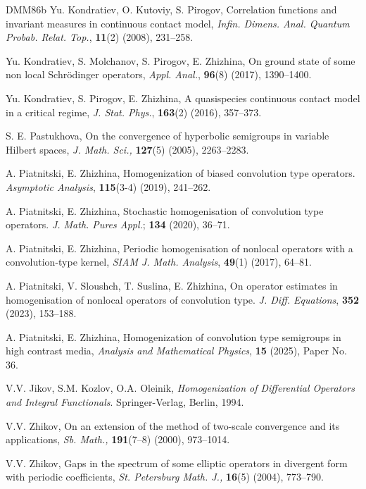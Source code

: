 \documentclass[11pt]{article}
\theoremstyle{remark}
\begin{document}
\begin{thebibliography}{DMM86b}
Yu. Kondratiev, O. Kutoviy, S. Pirogov, Correlation functions and invariant measures in continuous contact model,
{\it Infin. Dimens. Anal. Quantum Probab. Relat. Top.},  {\bf 11}(2) (2008),  231--258.

  Yu. Kondratiev, S. Molchanov, S. Pirogov, E. Zhizhina, On ground state of some non local Schrödinger operators,   {\it Appl. Anal.}, {\bf 96}(8) (2017), 1390--1400.

 Yu. Kondratiev, S. Pirogov, E. Zhizhina, A quasispecies continuous contact model
in a critical regime, {\it J. Stat. Phys.}, {\bf 163}(2) (2016),  357--373.

	 S. E. Pastukhova, On the convergence of hyperbolic semigroups in variable Hilbert spaces,  {\it   J. Math. Sci.,} {\bf 127}(5) (2005), 2263--2283.

A. Piatnitski,  E.  Zhizhina,      Homogenization of biased convolution type operators. {\it Asymptotic Analysis},
{\bf  115}(3-4) (2019), 241--262.

A. Piatnitski,  E.  Zhizhina,      Stochastic homogenisation of convolution type operators. {\it J. Math. Pures Appl.};
{\bf  134} (2020), 36--71.

 A. Piatnitski, E. Zhizhina,  Periodic homogenisation of nonlocal operators with a convolution-type kernel, {\it SIAM J. Math. Analysis}, {\bf 49}(1) (2017),  64--81.

A. Piatnitski,  V.  Sloushch, T. Suslina,  E.  Zhizhina,       On operator
 estimates in homogenisation of nonlocal operators of convolution type. {\it J. Diff. Equations},
 {\bf  352} (2023), 153--188.

 A. Piatnitski,  E.  Zhizhina,     Homogenization of convolution type semigroups in high contrast media, {\it  Analysis and Mathematical Physics}, {\bf 15} (2025), Paper No. 36.  %

	V.V. Jikov, S.M. Kozlov, O.A. Oleinik, {\it Homogenization of Differential Operators and Integral
		Functionals}. Springer-Verlag, Berlin, 1994.
	
	
    V.V. Zhikov,   On an extension of the method of two-scale
    convergence and its applications,  {\itshape Sb. Math.,}
    {\bf 191}(7--8) (2000), 973--1014.

     	V.V. Zhikov,  Gaps in the spectrum of some elliptic operators in divergent form with periodic coefficients,  \textit{St. Petersburg Math. J.,} {\bf 16}(5) (2004), 773--790.

\end{thebibliography}
\end{document}
